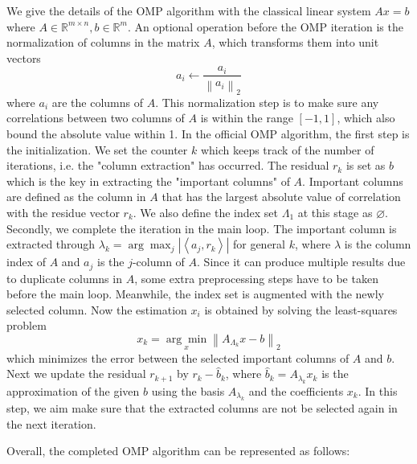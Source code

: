 \par We give the details of the OMP algorithm with the classical linear system $Ax = b$ where $A \in \mathbb{R}^{m \times n}, b \in \mathbb{R}^{m}$. An optional operation before the OMP iteration is the normalization of columns in the matrix $A$, which transforms them into unit vectors
\begin{equation}
    a_{i} \leftarrow \frac{a_{i}}{\left\|a_{i}\right\|_{2}}
\end{equation}
where $a_i$ are the columns of $A$. This normalization step is to make sure any correlations between two columns of $A$ is within the range $[-1, 1]$, which also bound the absolute value within 1. In the official OMP algorithm, the first step is the initialization. We set the counter $k$ which keeps track of the number of iterations, i.e. the "column extraction" has occurred. The residual $r_k$ is set as $b$ which is the key in extracting the "important columns" of $A$. Important columns are defined as the column in $A$ that has the largest absolute value of correlation with the residue vector ${r_k}$. We also define the index set $\Lambda_1$ at this stage as $\varnothing$. Secondly, we complete the iteration in the main loop. The important column is extracted through $\lambda_{k}=\arg \max _{j}\left|\left\langle a_{j}, r_{k}\right\rangle\right|$ for general $k$, where $\lambda$ is the column index of $A$ and $a_j$ is the $j$-column of $A$. Since it can produce multiple results due to duplicate columns in $A$, some extra preprocessing steps have to be taken before the main loop. Meanwhile, the index set is augmented with the newly selected column. Now the estimation $x_i$ is obtained by solving the least-squares problem
\begin{equation}
    x_{k}=\underset{x}{\arg \min }\left\|A_{\Lambda_{k}} x-b\right\|_{2}
\end{equation}
which minimizes the error between the selected important columns of $A$ and $b$. Next we update the residual $r_{k+1}$ by $r_k - \hat{b}_{k}$, where $\hat{b}_{k} = A_{\lambda_{k}} x_{k}$ is the approximation of the given $b$ using the basis $A_{\lambda_{k}}$ and the coefficients $x_{k}$. In this step, we aim make sure that the extracted columns are not be selected again in the next iteration. 
\par Overall, the completed OMP algorithm can be represented as follows:

